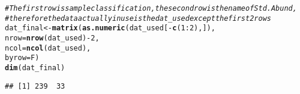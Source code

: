 \documentclass{article}\usepackage[]{graphicx}\usepackage[]{color}
\makeatletter
\newcommand{\hlnum}[1]{\textcolor[rgb]{0.686,0.059,0.569}{#1}}%
\newcommand{\hlcom}[1]{\textcolor[rgb]{0.678,0.584,0.686}{\textit{#1}}}%
\newcommand{\hlopt}[1]{\textcolor[rgb]{0,0,0}{#1}}%
\newcommand{\hlstd}[1]{\textcolor[rgb]{0.345,0.345,0.345}{#1}}%
\newcommand{\hlkwb}[1]{\textcolor[rgb]{0.69,0.353,0.396}{#1}}%
\newcommand{\hlkwc}[1]{\textcolor[rgb]{0.333,0.667,0.333}{#1}}%
\newcommand{\hlkwd}[1]{\textcolor[rgb]{0.737,0.353,0.396}{\textbf{#1}}}%
\newenvironment{kframe}{%
 \def\at@end@of@kframe{}%
 \ifinner\ifhmode%
  \def\at@end@of@kframe{\end{minipage}}%
  \begin{minipage}{\columnwidth}%
 \fi\fi%
 \def\FrameCommand##1{\hskip\@totalleftmargin \hskip-\fboxsep
 \colorbox{shadecolor}{##1}\hskip-\fboxsep
     \hskip-\linewidth \hskip-\@totalleftmargin \hskip\columnwidth}%
 \MakeFramed {\advance\hsize-\width
   \@totalleftmargin\z@ \linewidth\hsize
   \@setminipage}}%
 {\par\unskip\endMakeFramed%
 \at@end@of@kframe}
\newenvironment{knitrout}{}{} %
\makeatother
\begin{document}
\begin{knitrout}
\color{fgcolor}\begin{kframe}
\begin{alltt}
\hlcom{# The first row is sample  classification, the second row is the name of Std. Abund, }
\hlcom{# therefore the data actually in use is the dat_used except the first 2 rows}
\hlstd{dat_final} \hlkwb{<-} \hlkwd{matrix}\hlstd{(}\hlkwd{as.numeric}\hlstd{(dat_used[}\hlopt{-}\hlkwd{c}\hlstd{(}\hlnum{1}\hlopt{:}\hlnum{2}\hlstd{),]),}
                    \hlkwc{nrow} \hlstd{=} \hlkwd{nrow}\hlstd{(dat_used)}\hlopt{-}\hlnum{2}\hlstd{,}
                    \hlkwc{ncol} \hlstd{=} \hlkwd{ncol}\hlstd{(dat_used),}
                    \hlkwc{byrow} \hlstd{= F)}
\hlkwd{dim}\hlstd{(dat_final)}
\end{alltt}
\begin{verbatim}
## [1] 239  33
\end{verbatim}
\end{kframe}
\end{knitrout}
\end{document}
